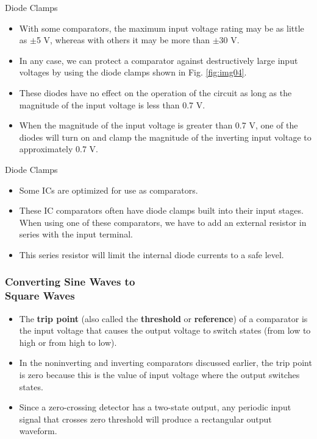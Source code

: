 \documentclass[pdflatex,compress]{beamer}
\begin{document}
\begin{frame}{Diode Clamps}
	\begin{itemize}
		\item With some comparators, the maximum input voltage rating may be as little as $\pm$5 V, whereas with others it may be more than $\pm$30 V.
		\item In any case, we can protect a comparator against destructively large input voltages by using the diode clamps shown in Fig. \ref{fig:img04}. \item These diodes have no effect on the operation of the circuit as long as the magnitude of the input voltage is less than 0.7 V.
		\item When the magnitude of the input voltage is greater than 0.7 V, one of the diodes will turn on and clamp the magnitude of the inverting input voltage to approximately 0.7 V.
	\end{itemize}
\end{frame}

\begin{frame}{Diode Clamps}
	\begin{itemize}
		\item Some ICs are optimized for use as comparators.
		\item These IC comparators often have diode clamps built into their input stages.
		When using one of these comparators, we have to add an external resistor in series with the input terminal.
		\item This series resistor will limit the internal diode currents to a safe level.
	\end{itemize}
\end{frame}

\begin{frame}
	\frametitle{Converting Sine Waves to\\Square Waves}
	\begin{itemize}
		\item The \textbf{trip point} (also called the \textbf{threshold} or \textbf{reference}) of a comparator is the input voltage that causes the output voltage to switch states (from low to high or from high to low).
		\item In the noninverting and inverting comparators discussed earlier, the trip point is zero because this is the value of input voltage where the output switches states.
		\item Since a zero-crossing detector has a two-state output, any periodic input signal that crosses zero threshold will produce a rectangular output waveform.
	\end{itemize}
\end{frame}
\end{document}
